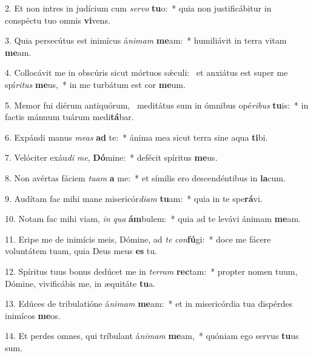 2. Et non intres in judícium cum \textit{ser}\textit{vo} \textbf{tu}o:~*  quia non justificábitur in conspéctu tuo omnis \textbf{vi}vens.\

3. Quia persecútus est inimícus á\textit{ni}\textit{mam} \textbf{me}am:~*  humiliávit in terra vitam \textbf{me}am.\

4. Collocávit me in obscúris sicut mórtuos sǽculi: \dag\  et anxiátus est super me spí\textit{ri}\textit{tus} \textbf{me}us,~*  in me turbátum est cor \textbf{me}um.\

5. Memor fui diérum antiquórum, \dag\  meditátus sum in ómnibus opé\textit{ri}\textit{bus} \textbf{tu}is:~*  in factis mánuum tuárum medi\textbf{tá}bar.\

6. Expándi manus \textit{me}\textit{as} \textbf{ad} te:~*  ánima mea sicut terra sine aqua \textbf{ti}bi.\

7. Velóciter exáu\textit{di} \textit{me}, \textbf{Dó}mine:~*  defécit spíritus \textbf{me}us.\

8. Non avértas fáciem \textit{tu}\textit{am} \textbf{a} me:~*  et símilis ero descendéntibus in \textbf{la}cum.\

9. Audítam fac mihi mane misericór\textit{di}\textit{am} \textbf{tu}am:~*  quia in te spe\textbf{rá}vi.\

10. Notam fac mihi viam, \textit{in} \textit{qua} \textbf{ám}bulem:~*  quia ad te levávi ánimam \textbf{me}am.\

11. Eripe me de inimícis meis, Dómine, ad \textit{te} \textit{con}\textbf{fú}gi:~*  doce me fácere voluntátem tuam, quia Deus meus \textbf{es} tu.\

12. Spíritus tuus bonus dedúcet me in \textit{ter}\textit{ram} \textbf{rec}tam:~*  propter nomen tuum, Dómine, vivificábis me, in æquitáte \textbf{tu}a.\

13. Edúces de tribulatióne á\textit{ni}\textit{mam} \textbf{me}am:~*  et in misericórdia tua dispérdes inimícos \textbf{me}os.\

14. Et perdes omnes, qui tríbulant á\textit{ni}\textit{mam} \textbf{me}am,~*  quóniam ego servus \textbf{tu}us sum.\

